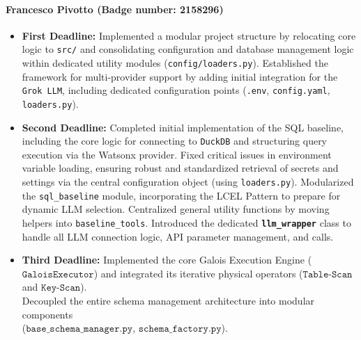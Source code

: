 \paragraph{\textbf{Francesco Pivotto (Badge number: 2158296)}}
\begin{itemize}[leftmargin=*]
    \item \textbf{First Deadline:} Implemented a modular project structure by relocating core logic to \texttt{src/} and consolidating configuration and database management logic within dedicated utility modules (\texttt{config/loaders.py}). 
    Established the framework for multi-provider support by adding initial integration for the \texttt{Grok LLM}, including dedicated configuration points (\texttt{.env}, \texttt{config.yaml}, \texttt{loaders.py}).
    
    \item \textbf{Second Deadline:} Completed initial implementation of the SQL baseline, including the core logic for connecting to \texttt{DuckDB} and structuring query execution via the Watsonx provider.
    Fixed critical issues in environment variable loading, ensuring robust and standardized retrieval of secrets and settings via the central configuration object (using \texttt{loaders.py}).
    Modularized the \texttt{sql\_baseline} module, incorporating the LCEL Pattern to prepare for dynamic LLM selection.
    Centralized general utility functions by moving helpers into \texttt{baseline\_tools}.
    Introduced the dedicated \textbf{\texttt{llm\_wrapper}} class to handle all LLM connection logic, API parameter management, and calls.

    \item \textbf{Third Deadline:} Implemented the core Galois Execution Engine ($\texttt{GaloisExecutor}$) and integrated its iterative physical operators ($\texttt{Table-Scan}$ and $\texttt{Key-Scan}$). \\
    Decoupled the entire schema management architecture into modular components \\ ($\texttt{base\_schema\_manager.py}$, $\texttt{schema\_factory.py}$).\\
    

\end{itemize}


